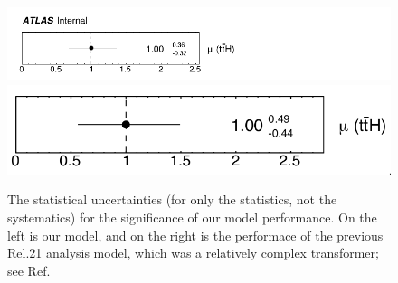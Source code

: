 \begin{figure}[ht]
    \centering
    
    \includegraphics[scale=0.35]{res/AnalysisPlots/NormFactors.png}
    \includegraphics[scale=0.22]{res/AnalysisPlots/NormFactors_rel21.png}

    \caption{The statistical uncertainties (for only the statistics, not the systematics) for the significance of our model performance. On the left is our model, and on the right is the performace of the previous Rel.21 analysis model, which was a relatively complex transformer; see Ref.~\cite{Yazykov}}
    \label{normFactors}
\end{figure}